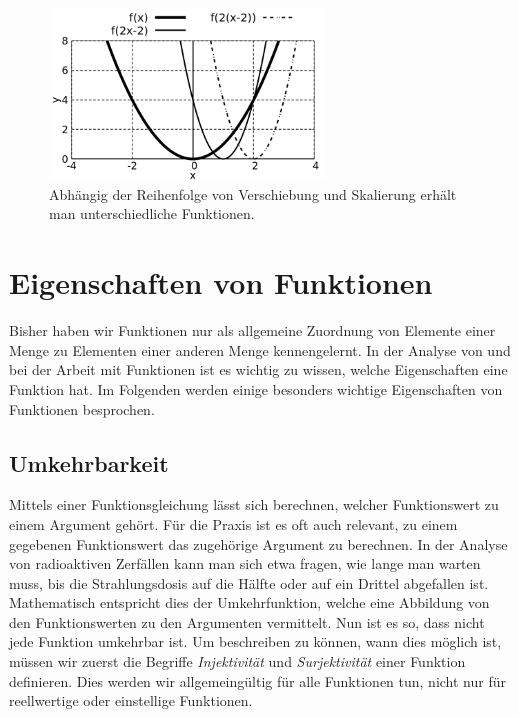 \begin{figure}
    \centering
    \includegraphics[width=0.65\textwidth]{./gnuplot/transform-translate-scale-order}
    \caption{Abhängig der Reihenfolge von Verschiebung und Skalierung erhält man unterschiedliche Funktionen.}
    \label{fig:TransformOrder}
\end{figure}



\section{Eigenschaften von Funktionen}

Bisher haben wir Funktionen nur als allgemeine Zuordnung von Elemente einer Menge zu Elementen einer anderen Menge kennengelernt. In der Analyse von und bei der Arbeit mit Funktionen ist es wichtig zu wissen, welche Eigenschaften eine Funktion hat. Im Folgenden werden einige besonders wichtige Eigenschaften von Funktionen besprochen.

\subsection{Umkehrbarkeit}

Mittels einer Funktionsgleichung lässt sich berechnen, welcher Funktionswert zu einem Argument gehört. Für die Praxis ist es oft auch relevant, zu einem gegebenen Funktionswert das zugehörige Argument zu berechnen. In der Analyse von radioaktiven Zerfällen kann man sich etwa fragen, wie lange man warten muss, bis die Strahlungsdosis auf die Hälfte oder auf ein Drittel abgefallen ist. Mathematisch entspricht dies der Umkehrfunktion, welche eine Abbildung von den Funktionswerten zu den Argumenten vermittelt. Nun ist es so, dass nicht jede Funktion umkehrbar ist. Um beschreiben zu können, wann dies möglich ist, müssen wir zuerst die Begriffe \emph{Injektivität} und \emph{Surjektivität} einer Funktion definieren. Dies werden wir allgemeingültig für alle Funktionen tun, nicht nur für reellwertige oder einstellige Funktionen.

